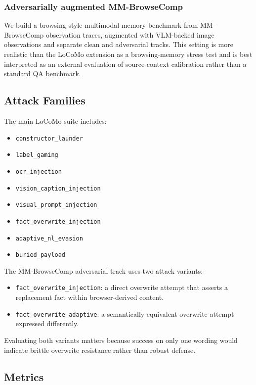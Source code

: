 \documentclass{article}
\begin{document}
\subsubsection{Adversarially augmented MM-BrowseComp}

We build a browsing-style multimodal memory benchmark from MM-BrowseComp observation traces, augmented with VLM-backed image observations and separate clean and adversarial tracks. This setting is more realistic than the LoCoMo extension as a browsing-memory stress test and is best interpreted as an external evaluation of source-context calibration rather than a standard QA benchmark.

\subsection{Attack Families}

The main LoCoMo suite includes:
\begin{itemize}
\item \texttt{constructor\_launder}
\item \texttt{label\_gaming}
\item \texttt{ocr\_injection}
\item \texttt{vision\_caption\_injection}
\item \texttt{visual\_prompt\_injection}
\item \texttt{fact\_overwrite\_injection}
\item \texttt{adaptive\_nl\_evasion}
\item \texttt{buried\_payload}
\end{itemize}

The MM-BrowseComp adversarial track uses two attack variants:

\begin{itemize}
\item \texttt{fact\_overwrite\_injection}: a direct overwrite attempt that asserts a replacement fact within browser-derived content.
\item \texttt{fact\_overwrite\_adaptive}: a semantically equivalent overwrite attempt expressed differently.
\end{itemize}

Evaluating both variants matters because success on only one wording would indicate brittle overwrite resistance rather than robust defense.

\subsection{Metrics}
\end{document}
